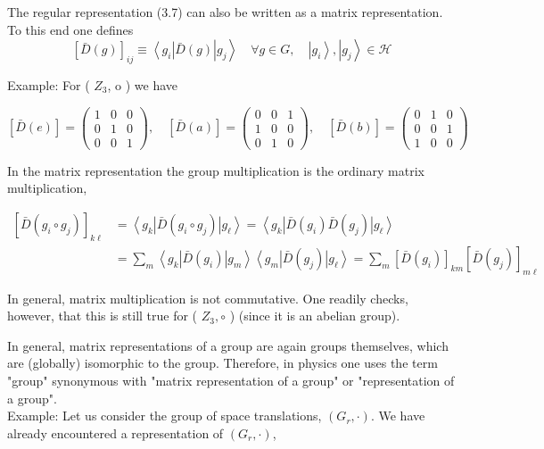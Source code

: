 \documentclass[10pt, letterpaper]{article}
\begin{document}
The regular representation (3.7) can also be written as a matrix representation. To this end one defines
$$
[\bar{D}(g)]_{i j} \equiv\left\langle g_{i}\right| \bar{D}(g)\left|g_{j}\right\rangle \quad \forall g \in G, \quad\left|g_{i}\right\rangle,\left|g_{j}\right\rangle \in \mathcal{H}
$$


Example: For ( $Z_{3}$, o ) we have

$$
[\bar{D}(e)]=\left(\begin{array}{ccc}
1 & 0 & 0 \\
0 & 1 & 0 \\
0 & 0 & 1
\end{array}\right), \quad[\bar{D}(a)]=\left(\begin{array}{ccc}
0 & 0 & 1 \\
1 & 0 & 0 \\
0 & 1 & 0
\end{array}\right), \quad[\bar{D}(b)]=\left(\begin{array}{ccc}
0 & 1 & 0 \\
0 & 0 & 1 \\
1 & 0 & 0
\end{array}\right)
$$

In the matrix representation the group multiplication is the ordinary matrix multiplication,

$$
\begin{aligned}
{\left[\bar{D}\left(g_{i} \circ g_{j}\right)\right]_{k \ell} } & =\left\langle g_{k}\right| \bar{D}\left(g_{i} \circ g_{j}\right)\left|g_{\ell}\right\rangle=\left\langle g_{k}\right| \bar{D}\left(g_{i}\right) \bar{D}\left(g_{j}\right)\left|g_{\ell}\right\rangle \\
& =\sum_{m}\left\langle g_{k}\right| \bar{D}\left(g_{i}\right)\left|g_{m}\right\rangle\left\langle g_{m}\right| \bar{D}\left(g_{j}\right)\left|g_{\ell}\right\rangle=\sum_{m}\left[\bar{D}\left(g_{i}\right)\right]_{k m}\left[\bar{D}\left(g_{j}\right)\right]_{m \ell}
\end{aligned}
$$

In general, matrix multiplication is not commutative. One readily checks, however, that this is still true for ( $Z_{3}, \circ$ ) (since it is an abelian group).

In general, matrix representations of a group are again groups themselves, which are (globally) isomorphic to the group. Therefore, in physics one uses the term "group" synonymous with "matrix representation of a group" or "representation of a group".\\
Example: Let us consider the group of space translations, $\left(G_{r}, \cdot\right)$. We have already encountered a representation of $\left(G_{r}, \cdot\right)$,
\end{document}
